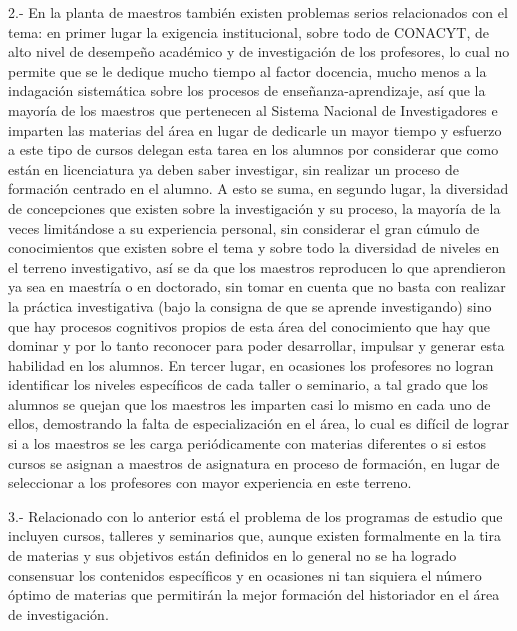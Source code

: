 \begin{Obs}
\item[2.-] En la planta de maestros también existen problemas serios 
relacionados con el tema: en primer lugar la exigencia institucional, 
sobre todo de CONACYT, de alto nivel de desempeño académico y de\linebreak 
investigación de los profesores, lo cual no permite que se le dedique 
mucho tiempo al factor docencia, mucho menos a la indagación 
sistemática sobre los procesos de enseñanza-aprendizaje, así que la 
mayoría de los maestros que pertenecen al Sistema Nacional de 
Investigadores e imparten las materias del área en lugar de dedicarle 
un mayor tiempo y esfuerzo a este tipo de cursos delegan esta tarea en 
los alumnos por considerar que como están en licenciatura ya deben 
saber investigar, sin realizar un proceso de formación centrado en el 
alumno. A esto se suma, en segundo lugar, la diversidad de concepciones 
que existen sobre la investigación y su proceso, la mayoría de la veces 
limitándose a su experiencia personal, sin considerar el gran cúmulo de 
conocimientos que existen sobre el tema y sobre todo la diversidad de 
niveles en el terreno investigativo, así se da que los maestros 
reproducen lo que aprendieron ya sea en maestría o en doctorado, sin 
tomar en cuenta que no basta con realizar la práctica investigativa 
(bajo la consigna de que se aprende investigando) sino que hay procesos 
cognitivos propios de esta área del conocimiento que hay que dominar y 
por lo tanto reconocer para poder desarrollar, impulsar y generar esta 
habilidad en los alumnos. En tercer lugar, en ocasiones los profesores 
no logran identificar los niveles específicos de cada taller o 
seminario, a tal grado que los alumnos se quejan que los maestros les 
imparten casi lo mismo en cada uno de ellos, demostrando la falta de 
especialización en el área, lo cual es difícil de lograr si a los 
maestros se les carga periódicamente con materias diferentes o si estos 
cursos se asignan a maestros de asignatura en proceso de formación, en 
lugar de seleccionar a los profesores con mayor experiencia en este 
terreno.

\enlargethispage{1\baselineskip}
\item[3.-] Relacionado con lo anterior está el problema de los programas de 
estudio que incluyen cursos, talleres y seminarios que, aunque existen 
formalmente en la tira de materias y sus objetivos están definidos en 
lo general no se ha logrado consensuar los contenidos específicos y en 
ocasiones ni tan siquiera el número óptimo de materias que permitirán 
la mejor formación del historiador en el área de investigación.


\end{Obs}
